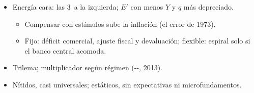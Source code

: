 \documentclass{article}
\begin{document}
\begin{columnas}
\begin{itemize}
  \begin{itemize}
  \item \emph{EDR}, decreciente: pares en que trabajadores, empresas y proveedores extranjeros aceptan su parte y la inflación no se mueve;
  \item \emph{BC}, creciente: más renta, más importaciones, más competitividad;
  \item \emph{DA}, creciente y más inclinada que la BC.
  \end{itemize}
\item Energía cara: las 3~a la izquierda; $E'$ con menos $Y$ y $q$ más depreciado.
  \begin{itemize}
  \item Compensar con estímulos sube la inflación (el error de 1973).
  \item Fijo: déficit comercial, ajuste fiscal y devaluación; flexible: espiral solo si el banco central acomoda.
  \end{itemize}
\end{itemize}
\begin{itemize}
\item Trilema; multiplicador según régimen (--, 2013).
\item Nítidos, casi universales; estáticos, sin expectativas ni microfundamentos.
\end{itemize}


\end{columnas}
\end{document}
